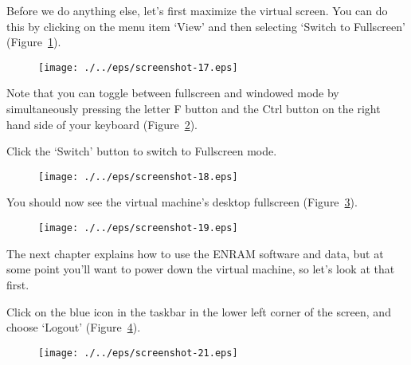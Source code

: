 Before we do anything else, let's first maximize the virtual screen. You can do this by clicking on the menu item `View' and then selecting `Switch to Fullscreen' (Figure~\ref{fig:screenshot-17}).

\begin{figure}[ht]
  \centering
    \texttt{[image: ./../eps/screenshot-17.eps]}
  \caption{}
  \label{fig:screenshot-17}
\end{figure}
\clearpage


Note that you can toggle between fullscreen and windowed mode by simultaneously pressing the letter F button and the Ctrl button on the right hand side of your keyboard (Figure~\ref{fig:screenshot-18}).

Click the `Switch' button to switch to Fullscreen mode.

\begin{figure}[ht]
  \centering
    \texttt{[image: ./../eps/screenshot-18.eps]}
  \caption{}
  \label{fig:screenshot-18}
\end{figure}

You should now see the virtual machine's desktop fullscreen (Figure~\ref{fig:screenshot-19}).

\begin{figure}[ht]
  \centering
    \texttt{[image: ./../eps/screenshot-19.eps]}
  \caption{}
  \label{fig:screenshot-19}
\end{figure}
\clearpage


The next chapter explains how to use the ENRAM software and data, but at some point you'll want to power down the virtual machine, so let's look at that first.

Click on the blue icon in the taskbar in the lower left corner of the screen, and choose `Logout' (Figure~\ref{fig:screenshot-21}).

\begin{figure}[ht]
  \centering
    \texttt{[image: ./../eps/screenshot-21.eps]}
  \caption{}
  \label{fig:screenshot-21}
\end{figure}
\clearpage

